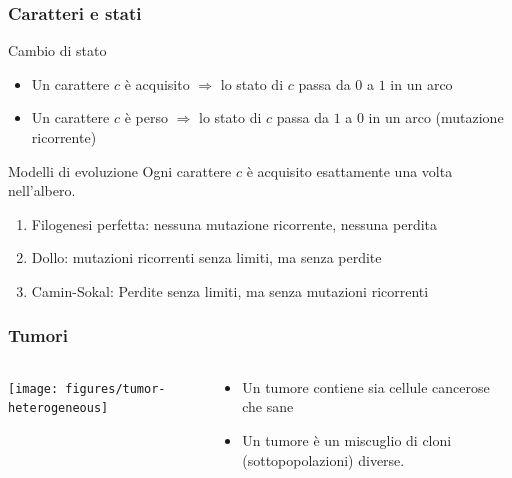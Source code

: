 




\begin{frame}
	\frametitle{Caratteri e stati}

	\begin{block}{Cambio di stato}
		\begin{itemize}
			\item  Un carattere $c$ è  \alert{acquisito} $\Rightarrow$ lo stato di  $c$ passa da  $0$ a $1$
			      in un arco
			\item  Un carattere $c$ è \alert{perso} $\Rightarrow$   lo stato di  $c$ passa da  $1$ a $0$
			      in un arco (\alert{mutazione ricorrente})
		\end{itemize}
	\end{block}

	\begin{block}{Modelli di evoluzione}
		Ogni carattere $c$ è  acquisito \alert{esattamente una volta} nell'albero.
		\begin{enumerate}
			\item
			      Filogenesi perfetta: nessuna mutazione ricorrente, nessuna perdita
			\item
			      \alert{Dollo}:
			      mutazioni ricorrenti senza limiti, ma senza perdite
			\item
			      \alert{Camin-Sokal}:
			      Perdite senza limiti, ma senza mutazioni ricorrenti
		\end{enumerate}
	\end{block}
\end{frame}


\begin{frame}
	\frametitle{Tumori}
	\begin{columns}
		\begin{column}{0.75\textwidth}
			\centering
			\texttt{[image: figures/tumor-heterogeneous]}
		\end{column}
		\begin{column}{0.25\textwidth}
			\begin{itemize}
				\item
				      Un \alert{tumore} contiene sia cellule cancerose che sane
				\item
				      Un \alert{tumore} è un miscuglio di cloni (sottopopolazioni) diverse.
			\end{itemize}
		\end{column}
	\end{columns}
\end{frame}


